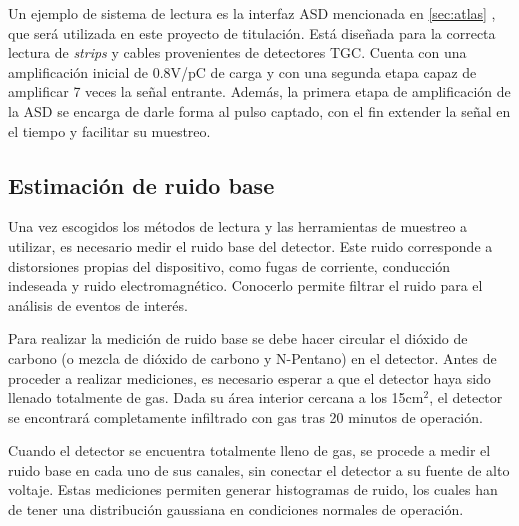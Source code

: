 		Un ejemplo de sistema de lectura es la interfaz ASD mencionada en \ref{sec:atlas} , que será utilizada en este proyecto de titulación. Está diseñada para la correcta lectura de \textit{strips} y cables provenientes de detectores TGC.  Cuenta con una amplificación inicial de 0.8V/pC de carga y con una segunda etapa capaz de amplificar 7 veces la señal entrante. Además, la primera etapa de amplificación de la ASD se encarga de darle forma al pulso captado, con el fin extender la señal en el tiempo y facilitar su muestreo.
		
		

	\subsection{Estimación de ruido base}
		Una vez escogidos los métodos de lectura y las herramientas de muestreo a utilizar, es necesario medir el ruido base del detector. Este ruido corresponde a distorsiones propias del dispositivo, como fugas de corriente, conducción indeseada y ruido electromagnético. Conocerlo  permite filtrar el ruido para el análisis de eventos de interés.
		
		Para realizar la medición de ruido base se debe hacer circular el dióxido de carbono (o mezcla de dióxido de carbono y N-Pentano) en el detector. Antes de proceder a realizar mediciones, es necesario esperar a que el detector haya sido llenado totalmente de gas. Dada su área interior cercana a los 15cm$^2$, el detector se encontrará completamente infiltrado con gas tras 20 minutos de operación. 
		
		Cuando el detector se encuentra totalmente lleno de gas, se procede a medir el ruido base en cada uno de sus canales, sin conectar el detector a su fuente de alto voltaje. Estas mediciones permiten generar histogramas de ruido, los cuales han de tener una distribución gaussiana en condiciones normales de operación. 
		
